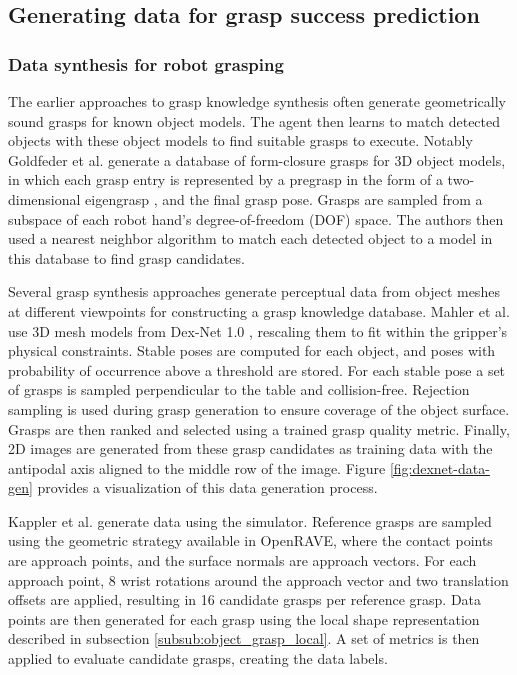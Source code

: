 
\subsection{Generating data for grasp success prediction}

\subsubsection{Data synthesis for robot grasping}

The earlier approaches to grasp knowledge synthesis often generate geometrically sound grasps for known object models.
The agent then learns to match detected objects with these object models to find suitable grasps to execute. Notably
Goldfeder et al. \cite{Goldfeder2009CGDB} generate a database of form-closure grasps for 3D object models, in which each
grasp entry is represented by a pregrasp in the form of a two-dimensional eigengrasp \cite{Ciocarlie2009}, and the final
grasp pose. Grasps are sampled from a subspace of each robot hand's degree-of-freedom (DOF) space. The authors then used
a nearest neighbor algorithm to match each detected object to a model in this database \cite{Goldfeder2011} to find
grasp candidates.

Several grasp synthesis approaches generate perceptual data from object meshes at different viewpoints
\cite{mahler2017,Gualtieri2016,Kappler2015} for constructing a grasp knowledge database. Mahler et al. \cite{mahler2017}
use 3D mesh models from Dex-Net 1.0 \cite{mahler2016}, rescaling them to fit within the gripper's physical constraints.
Stable poses are computed for each object, and poses with probability of occurrence above a threshold are stored.
For each stable pose a set of grasps is sampled perpendicular to the table and collision-free. Rejection sampling
is used during grasp generation to ensure coverage of the object surface. Grasps are then ranked and selected using
a trained grasp quality metric. Finally, 2D images are generated from these grasp candidates as training data with the
antipodal axis aligned to the middle row of the image. Figure \ref{fig:dexnet-data-gen} provides a visualization of this
data generation process.

Kappler et al. \cite{Kappler2015} generate data using the 
\cite{Diankov2010} simulator. Reference grasps are sampled using the geometric strategy available in OpenRAVE, where the
contact points are approach points, and the surface normals are approach vectors. For each approach point, 8 wrist
rotations around the approach vector and two translation offsets are applied, resulting in 16 candidate grasps per
reference grasp. Data points are then generated for each grasp using the local shape representation described in
subsection \ref{subsub:object_grasp_local}. A set of metrics is then applied to evaluate candidate grasps, creating the
data labels.

